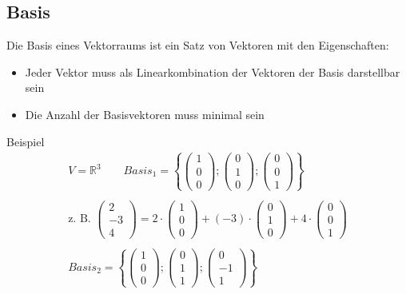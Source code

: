 \subsection{Basis}
Die Basis eines Vektorraums ist ein Satz von Vektoren mit den Eigenschaften:
\begin{itemize}
  \item Jeder Vektor muss als Linearkombination der Vektoren der Basis darstellbar sein
  \item Die Anzahl der Basisvektoren muss minimal sein
\end{itemize}
Beispiel
\begin{gather*}
  V = \mathbb{R}^3 \qquad Basis_1 = \left\{\begin{pmatrix}1 \\ 0 \\ 0\end{pmatrix}; \begin{pmatrix}0 \\ 1 \\ 0\end{pmatrix}; \begin{pmatrix}0 \\ 0 \\ 1\end{pmatrix}\right\} \\\\
  \text{z. B. } \begin{pmatrix}2 \\ -3 \\ 4\end{pmatrix} = 2 \cdot \begin{pmatrix}1 \\ 0 \\ 0\end{pmatrix} + (-3) \cdot \begin{pmatrix}0 \\ 1 \\ 0\end{pmatrix} + 4 \cdot \begin{pmatrix}0 \\ 0 \\ 1\end{pmatrix} \\\\
  Basis_2 = \left\{\begin{pmatrix}1 \\ 0 \\ 0\end{pmatrix}; \begin{pmatrix}0 \\ 1 \\ 1\end{pmatrix}; \begin{pmatrix}0 \\ -1 \\ 1\end{pmatrix}\right\} \\\\

\end{gather*}
